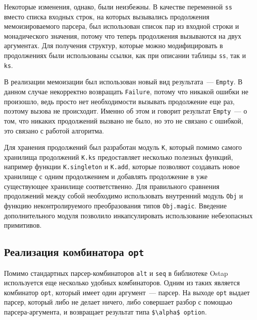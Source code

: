 \documentclass[conference]{IEEEtran}
\begin{document}

Некоторые изменения, однако, были неизбежны. В качестве переменной  \lstinline|ss| вместо списка входных строк, на которых вызывались продолжения мемоизироваемого парсера, был использован список
пар из входной строки и монадического значения, потому что теперь продолжения вызываются на двух аргументах. Для получения структур, которые можно модифицировать в продолжениях были
использованы ссылки, как при описании таблицы \lstinline|ss|, так и \lstinline|ks|.

В реализации мемоизации был использован новый вид результата~--- \lstinline|Empty|. В данном случае некорректно возвращать \lstinline|Failure|, потому что никакой ошибки не произошло,
ведь просто нет необходимости вызывать продолжение еще раз, поэтому вызова не происходит. Именно об этом и говорит результат \lstinline|Empty|~--- о том, что никаких продолжений
вызвано не было, но это не связано с ошибкой, это связано с работой алгоритма.

Для хранения продолжений был разработан модуль \lstinline|K|, который помимо самого хранилища продолжений \lstinline|K.ks| предоставляет несколько полезных функций, например
функции \lstinline|K.singleton| и  \lstinline|K.add|, которые позволяют создавать новое хранилище с одним продолжением и добавлять продолжение в уже существующее хранилище
соответственно. Для правильного сравнения продолжений между собой необходимо использовать внутренний модуль \lstinline|Obj| и функцию неконтролируемого преобразования типов
\lstinline|Obj.magic|. Введение дополнительного модуля позволило инкапсулировать использование небезопасных примитивов.

\subsection{Реализация комбинатора \lstinline|opt|}

Помимо стандартных парсер-комбинаторов \lstinline|alt| и \lstinline|seq| в библиотеке Ostap используется еще несколько удобных комбинаторов. Одним из таких является комбинатор
\lstinline|opt|, который имеет один аргумент~--- парсер. На выходе \lstinline|opt| выдает парсер, который либо не делает ничего, либо совершает разбор с помощью парсера-аргумента,
и возвращает результат типа \lstinline|$\alpha$ option|. 
\end{document}

